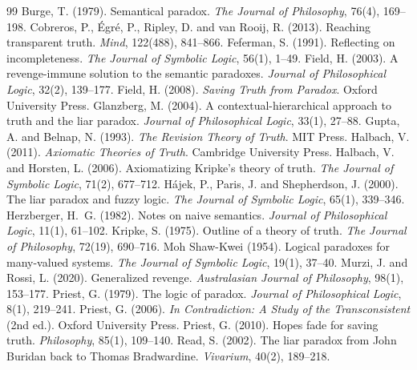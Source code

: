\documentclass{situationist-preprint}
\begin{document}
\begin{thebibliography}{99}\small
{} Burge, T. (1979). Semantical paradox. \emph{The Journal of Philosophy}, 76(4), 169--198.
 Cobreros, P., Égré, P., Ripley, D. and van Rooij, R. (2013). Reaching transparent truth. \emph{Mind}, 122(488), 841--866.
 Feferman, S. (1991). Reflecting on incompleteness. \emph{The Journal of Symbolic Logic}, 56(1), 1--49.
 Field, H. (2003). A revenge-immune solution to the semantic paradoxes. \emph{Journal of Philosophical Logic}, 32(2), 139--177.
 Field, H. (2008). \emph{Saving Truth from Paradox}. Oxford University Press.
 Glanzberg, M. (2004). A contextual-hierarchical approach to truth and the liar paradox. \emph{Journal of Philosophical Logic}, 33(1), 27--88.
 Gupta, A. and Belnap, N. (1993). \emph{The Revision Theory of Truth}. MIT Press.
 Halbach, V. (2011). \emph{Axiomatic Theories of Truth}. Cambridge University Press.
 Halbach, V. and Horsten, L. (2006). Axiomatizing Kripke's theory of truth. \emph{The Journal of Symbolic Logic}, 71(2), 677--712.
 Hájek, P., Paris, J. and Shepherdson, J. (2000). The liar paradox and fuzzy logic. \emph{The Journal of Symbolic Logic}, 65(1), 339--346.
 Herzberger, H.~G. (1982). Notes on naive semantics. \emph{Journal of Philosophical Logic}, 11(1), 61--102.
 Kripke, S. (1975). Outline of a theory of truth. \emph{The Journal of Philosophy}, 72(19), 690--716.
 Moh Shaw-Kwei (1954). Logical paradoxes for many-valued systems. \emph{The Journal of Symbolic Logic}, 19(1), 37--40.
 Murzi, J. and Rossi, L. (2020). Generalized revenge. \emph{Australasian Journal of Philosophy}, 98(1), 153--177.
 Priest, G. (1979). The logic of paradox. \emph{Journal of Philosophical Logic}, 8(1), 219--241.
 Priest, G. (2006). \emph{In Contradiction: A Study of the Transconsistent} (2nd ed.). Oxford University Press.
 Priest, G. (2010). Hopes fade for saving truth. \emph{Philosophy}, 85(1), 109--140.
 Read, S. (2002). The liar paradox from John Buridan back to Thomas Bradwardine. \emph{Vivarium}, 40(2), 189--218.

\end{thebibliography}
\end{document}
